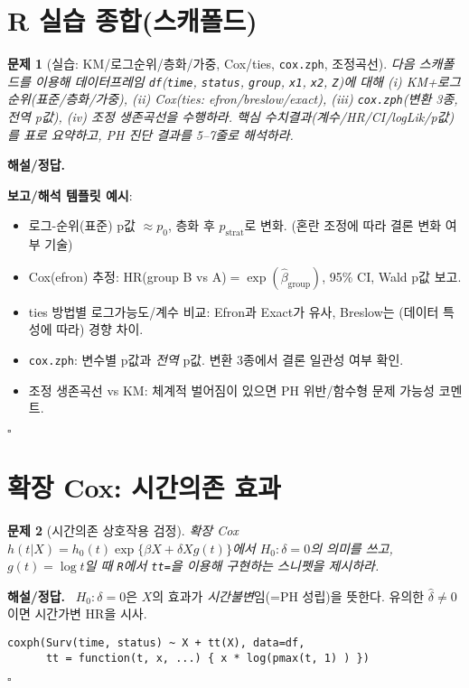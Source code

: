 \documentclass[12pt]{article}
\theoremstyle{myplain}
\newtheorem{problem}{문제}
\newenvironment{solution}{%
  \par\noindent\textbf{해설/정답.}\ }{\hfill$\square$\par}
\begin{document}
\section{R 실습 종합(스캐폴드)}

\begin{problem}[실습: KM/로그순위/층화/가중, Cox/ties, \texttt{cox.zph}, 조정곡선]
다음 스캐폴드를 이용해 데이터프레임 \texttt{df}(\texttt{time}, \texttt{status}, \texttt{group}, \texttt{x1}, \texttt{x2}, \texttt{Z})에 대해
(i) KM+로그순위(표준/층화/가중), (ii) Cox(ties: efron/breslow/exact), (iii) \texttt{cox.zph}(변환 3종, 전역 p값), (iv) 조정 생존곡선을 수행하라.
핵심 수치결과(계수/HR/CI/logLik/p값)를 표로 요약하고, PH 진단 결과를 5--7줄로 해석하라.
\end{problem}

\begin{solution}


\textbf{보고/해석 템플릿 예시}:
\begin{itemize}[leftmargin=*]
\item 로그-순위(표준) p값 $\approx p_0$, 층화 후 $p_{\mathrm{strat}}$로 변화. (혼란 조정에 따라 결론 변화 여부 기술)
\item Cox(efron) 추정: HR(group B vs A)$=\exp(\hat\beta_{\text{group}})$, 95\% CI, Wald p값 보고.
\item ties 방법별 로그가능도/계수 비교: Efron과 Exact가 유사, Breslow는 (데이터 특성에 따라) 경향 차이.
\item \texttt{cox.zph}: 변수별 p값과 \emph{전역} p값. 변환 3종에서 결론 일관성 여부 확인.
\item 조정 생존곡선 vs KM: 체계적 벌어짐이 있으면 PH 위반/함수형 문제 가능성 코멘트.
\end{itemize}
\end{solution}

\section{확장 Cox: 시간의존 효과}

\begin{problem}[시간의존 상호작용 검정]
확장 Cox $h(t|X)=h_0(t)\exp\{\beta X+\delta X g(t)\}$에서 $H_0:\delta=0$의 의미를 쓰고,
$g(t)=\log t$일 때 \texttt{R}에서 \texttt{tt=}을 이용해 구현하는 스니펫을 제시하라.
\end{problem}

\begin{solution}
$H_0:\delta=0$은 $X$의 효과가 \emph{시간불변}임(=PH 성립)을 뜻한다.
유의한 $\hat\delta\neq 0$이면 시간가변 HR을 시사.
\begin{lstlisting}
coxph(Surv(time, status) ~ X + tt(X), data=df,
      tt = function(t, x, ...) { x * log(pmax(t, 1) ) })
\end{lstlisting}
\end{solution}
\end{document}
